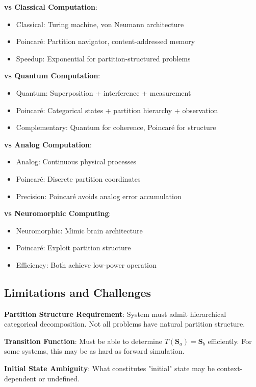 \documentclass[twocolumn,10pt]{article}
\begin{document}
\textbf{vs Classical Computation}:
\begin{itemize}
\item Classical: Turing machine, von Neumann architecture
\item Poincaré: Partition navigator, content-addressed memory
\item Speedup: Exponential for partition-structured problems
\end{itemize}

\textbf{vs Quantum Computation}:
\begin{itemize}
\item Quantum: Superposition + interference + measurement
\item Poincaré: Categorical states + partition hierarchy + observation
\item Complementary: Quantum for coherence, Poincaré for structure
\end{itemize}

\textbf{vs Analog Computation}:
\begin{itemize}
\item Analog: Continuous physical processes
\item Poincaré: Discrete partition coordinates
\item Precision: Poincaré avoids analog error accumulation
\end{itemize}

\textbf{vs Neuromorphic Computing}:
\begin{itemize}
\item Neuromorphic: Mimic brain architecture
\item Poincaré: Exploit partition structure
\item Efficiency: Both achieve low-power operation
\end{itemize}

\subsection{Limitations and Challenges}

\textbf{Partition Structure Requirement}: System must admit hierarchical categorical decomposition. Not all problems have natural partition structure.

\textbf{Transition Function}: Must be able to determine $T(\mathbf{S}_a) = \mathbf{S}_b$ efficiently. For some systems, this may be as hard as forward simulation.

\textbf{Initial State Ambiguity}: What constitutes "initial" state may be context-dependent or undefined.
\end{document}
